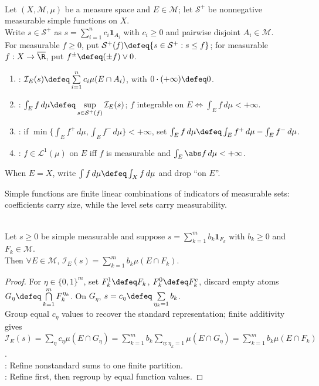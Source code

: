 \begin{definition} \label{def:simple-functions-and-lebesgue-integral} \\
Let $(X,\mathcal{M},\mu)$ be a measure space and $E\in\mathcal{M}$; let $\mathcal{S}^+$ be nonnegative measurable simple functions on $X$.\\
Write $s\in\mathcal{S}^+$ as $s=\sum\limits_{i=1}^{n}c_i\mathbf{1}_{A_i}$ with $c_i\geq0$ and pairwise disjoint $A_i\in\mathcal{M}$.\\
For measurable $f\geq0$, put $\mathcal{S}^+(f)\defeq\{s\in\mathcal{S}^+:s\leq f\}$; for measurable $f:X\to\overline{\R}$, put $f^\pm\defeq(\pm f)\vee0$.
\begin{enumerate}[label=(\roman*)]
\setlength{\itemsep}{0pt}
\item {}: $\mathcal{I}_E(s)\defeq\sum\limits_{i=1}^{n}c_i\mu(E\cap A_i)$, with $0\cdot(+\infty)\defeq0$.
\item {}: $\int_Ef\,d\mu\defeq\sup\limits_{s\in\mathcal{S}^+(f)}\mathcal{I}_E(s)$; $f$ integrable on $E\Longleftrightarrow\int_Ef\,d\mu<+\infty$.
\item {}: if $\min\{\int_Ef^+\,d\mu,\int_Ef^-\,d\mu\}<+\infty$, set $\int_Ef\,d\mu\defeq\int_Ef^+\,d\mu-\int_Ef^-\,d\mu$.
\item {}: $f\in\mathscr{L}^1(\mu)$ on $E$ iff $f$ is measurable and $\int_E\abs f\,d\mu<+\infty$.
\end{enumerate}
When $E=X$, write $\int f\,d\mu\defeq\int_Xf\,d\mu$ and drop ``on $E$''.
\end{definition}

Simple functions are finite linear combinations of indicators of measurable sets: coefficients carry size, while the level sets carry measurability.

\begin{lemma} \label{lem:simple-integral-refinement} \\
Let $s\geq0$ be simple measurable and suppose $s=\sum\limits_{k=1}^{m}b_k\mathbf{1}_{F_k}$ with $b_k\geq0$ and $F_k\in\mathcal{M}$.\\
Then $\forall E\in\mathcal{M}$, $\mathcal{I}_E(s)=\sum\limits_{k=1}^{m}b_k\mu(E\cap F_k)$.
\begin{proof}
For $\eta\in\{0,1\}^m$, set $F_k^1\defeq F_k$, $F_k^0\defeq F_k^c$, discard empty atoms $G_\eta\defeq\bigcap\limits_{k=1}^{m}F_k^{\eta_k}$. On $G_\eta$, $s=c_\eta\defeq\sum\limits_{\eta_k=1}b_k$.\\
Group equal $c_\eta$ values to recover the standard representation; finite additivity gives\\
$\mathcal{I}_E(s)=\sum\limits_\eta c_\eta\mu(E\cap G_\eta) =\sum\limits_{k=1}^{m}b_k\sum\limits_{\eta:\eta_k=1}\mu(E\cap G_\eta) =\sum\limits_{k=1}^{m}b_k\mu(E\cap F_k)$.\\
: Refine nonstandard sums to one finite partition.\\
: Refine first, then regroup by equal function values.
\end{proof}
\end{lemma}

